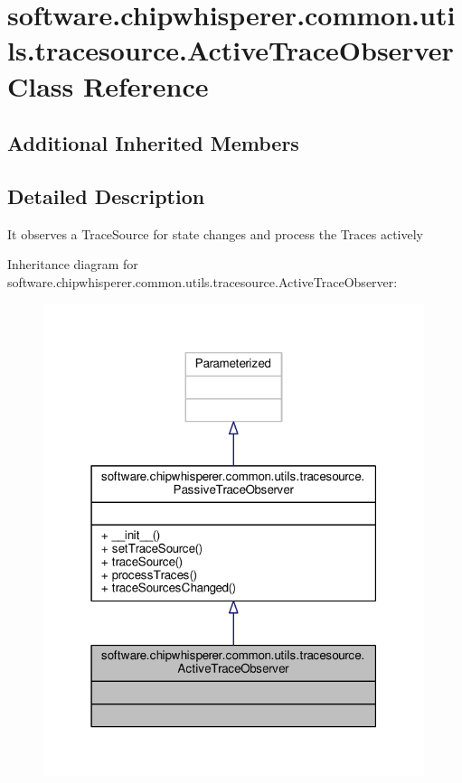 \hypertarget{classsoftware_1_1chipwhisperer_1_1common_1_1utils_1_1tracesource_1_1ActiveTraceObserver}{}\section{software.\+chipwhisperer.\+common.\+utils.\+tracesource.\+Active\+Trace\+Observer Class Reference}
\label{classsoftware_1_1chipwhisperer_1_1common_1_1utils_1_1tracesource_1_1ActiveTraceObserver}
\subsection*{Additional Inherited Members}


\subsection{Detailed Description}
\begin{DoxyVerb}It observes a TraceSource for state changes and process the Traces actively \end{DoxyVerb}
 

Inheritance diagram for software.\+chipwhisperer.\+common.\+utils.\+tracesource.\+Active\+Trace\+Observer\+:\nopagebreak
\begin{figure}[H]
\begin{center}
\leavevmode
\includegraphics[width=316pt]{da/de9/classsoftware_1_1chipwhisperer_1_1common_1_1utils_1_1tracesource_1_1ActiveTraceObserver__inherit__graph}
\end{center}
\end{figure}


